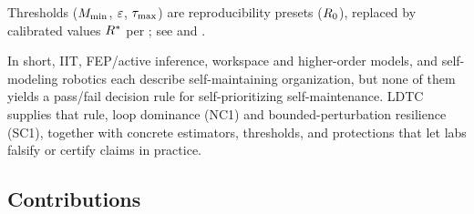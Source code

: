 \documentclass[11pt]{article}
\begin{document}
Thresholds ($M_{\min}$, $\varepsilon$, $\tau_{\max}$) are reproducibility presets ($R_0$), replaced by calibrated values $R^*$ per ; see  and .

In short, IIT, FEP/active inference, workspace and higher-order models, and self-modeling robotics each describe self-maintaining organization, but none of them yields a pass/fail decision rule for self-prioritizing self-maintenance. LDTC supplies that rule, loop dominance (NC1) and bounded-perturbation resilience (SC1), together with concrete estimators, thresholds, and protections that let labs falsify or certify claims in practice.

\subsection{Contributions}
\end{document}
